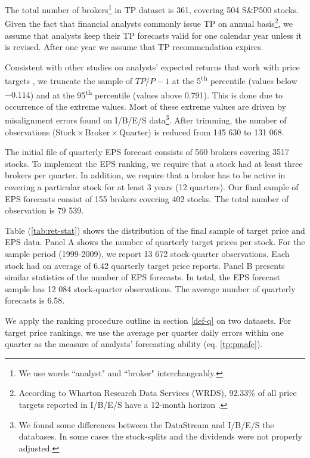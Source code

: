 \documentclass{article}\usepackage[]{graphicx}\usepackage[]{color}
\begin{document}
The total number of brokers\footnote{We use words ``analyst" and ``broker" interchangeably.} in TP dataset is 361, covering 504 S\&P500 stocks. Given the fact that financial analysts commonly issue TP on annual basis\footnote{According to Wharton Research Data Services (WRDS), 92.33\% of all price targets reported in I/B/E/S have a 12-month horizon \citep{glushkov2009}.}, we assume that analysts keep their TP forecasts valid for one calendar year unless it is revised. After one year we assume that TP recommendation expires.

Consistent with other studies on analysts' expected returns that work with price targets  \citep{bradshaw2002,brav2003,da2011}, we truncate the sample of $TP/P-1$ at the 5\textsuperscript{th} percentile (values below \ensuremath{-0.114}) and at the 95\textsuperscript{th} percentile (values above 0.791). This is done due to occurrence of the extreme values. Most of these extreme values are driven by misalignment errors found on I/B/E/S data\footnote{We found some differences between the  DataStream and I/B/E/S the databases. In some cases the stock-splits and the dividends were not properly adjusted.}. After trimming, the number of observations ($\mathrm{Stock} \times \mathrm{Broker} \times  \mathrm{Quarter}$) is reduced  from 145 630 to 131 068.

The initial file of quarterly EPS forecast consists of  560 brokers covering 3517 stocks. To implement the EPS ranking, we require that a stock had at least three brokers per quarter. In addition, we require that a broker has to be active in covering a particular stock for at least 3 years (12 quarters). Our final sample of EPS forecasts consist of  155 brokers covering 402 stocks. The total number of observation is 79 539.
 

Table (\ref{tab:ret-stat}) shows the distribution of the final sample of target price and EPS data. Panel A shows the number of quarterly target prices per stock. For the sample period (1999-2009), we report 13 672 stock-quarter observations. Each stock had on average of 6.42 quarterly target price reports. Panel B  presents similar statistics of the number of EPS forecasts. In total, the EPS forecast sample has 12 084 stock-quarter observations. The average number of quarterly forecasts is 6.58.

We apply the ranking procedure outline in section \ref{def-q} on two datasets. For target price rankings, we use the average per quarter daily errors within one quarter as the measure of analysts' forecasting ability (eq. \ref{tp:pmafe}). 
\end{document}
